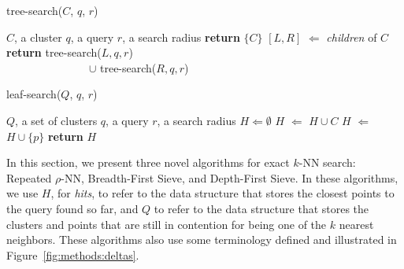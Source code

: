 \begin{minipage}{.425\textwidth}
    \begin{algorithm}[H]
        \caption{tree-search($C$, $q$, $r$)}
        \label{alg:methods:rnn-search:tree-search}
        \begin{algorithmic}
            \Require $C$, a cluster
            \Require $q$, a query
            \Require $r$, a search radius
                \State \textbf{return} $\{C\}$
            \Else
                \State $[L, R]$ $\Leftarrow$ \textit{children} of $C$
                \State \textbf{return} tree-search($L, q, r$) \\
                \ \ \ \ \ \ \ \ \ \ \ \ \ \ \ $\cup$ tree-search($R, q, r$)
            \EndIf
        \end{algorithmic}
    \end{algorithm}
\end{minipage}
\hfill
\begin{minipage}{.475\textwidth}
    \begin{algorithm}[H]
        \caption{leaf-search($Q$, $q$, $r$)}
        \label{alg:methods:rnn-search:leaf-search}
        \begin{algorithmic}
            \Require $Q$, a set of clusters
            \Require $q$, a query
            \Require $r$, a search radius
            \State $H \Leftarrow \emptyset$
                    \State $H$ $\Leftarrow$ $H \cup C$
                \Else
                            \State $H$ $\Leftarrow$ $H \cup \{p\}$
                        \EndIf
                    \EndFor
                \EndIf
            \EndFor
            \State \textbf{return} $H$
        \end{algorithmic}
    \end{algorithm}
\end{minipage}

In this section, we present three novel algorithms for exact $k$-NN search:
Repeated $\rho$-NN, Breadth-First Sieve, and Depth-First Sieve.
In these algorithms, we use $H$, for \textit{hits}, to refer to the data structure that stores the closest points to the query found so far, and $Q$ to refer to the data structure that stores the clusters and points that are still in contention for being one of the $k$ nearest neighbors.
These algorithms also use some terminology defined and illustrated in Figure~\ref{fig:methods:deltas}.


